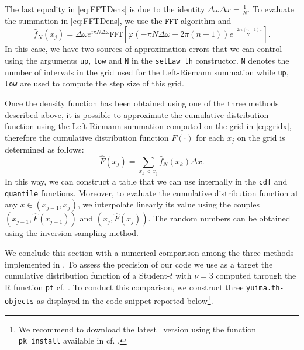 The last equality in \eqref{eq:FFTDens} is due to the identity \(\Delta \omega \Delta x = \frac{1}{N}\). To evaluate the summation in \eqref{eq:FFTDens}, we use the \(\texttt{FFT}\) algorithm and
\begin{equation}
\hat{f}_{N}\left(x_j\right) = \Delta \omega e^{i\pi N \Delta \omega}\texttt{FFT}\left[\varphi\left(-\pi N\Delta \omega + 2\pi \left(n-1\right)\right)e^{ \frac{-2 i \pi \left(n-1\right)a}{N}}\right].
\end{equation}
In this case, we have two sources of approximation errors that we can control using the arguments \texttt{up}, \texttt{low} and \texttt{N} in the \texttt{setLaw\_th} constructor. \texttt{N} denotes the number of intervals in the grid used for the Left-Riemann summation while \texttt{up}, \texttt{low} are used to compute the step size of this grid.

Once the density function has been obtained using one of the three methods described above, it is possible to approximate the cumulative distribution function using the Left-Riemann summation computed on the grid in \eqref{eq:gridx}, therefore the cumulative distribution function \(F\left(\cdot\right)\) for each \(x_j\) on the grid is determined as follows:
\begin{equation}
\hat{F}\left(x_j\right) = \sum_{x_k<x_j}\hat{f}_{N}\left(x_k\right)\Delta x.
\end{equation}
In this way, we can construct a table that we can use internally in the \texttt{cdf} and \texttt{quantile} functions. Moreover, to evaluate the cumulative distribution function at any \(x\in \left( x_{j-1}, x_j \right)\), we interpolate linearly its value using the couples \(\left(x_{j-1}, \hat{F}\left(x_{j-1}\right)\right)\) and \(\left(x_{j}, \hat{F}\left(x_{j}\right)\right)\). The random numbers can be obtained using the inversion sampling method.

We conclude this section with a numerical comparison among the three methods implemented in . To assess the precision of our code we use as a target the cumulative distribution function of a Student-\(t\) with \(\nu = 3\) computed through the \textsf{R} function \texttt{pt} cf. \citet{Man}. To conduct this comparison, we construct three \texttt{yuima.th-objects} as displayed in the code snippet reported below\footnote{We recommend to download the latest  ~version using the function \texttt{pk\_install} available in  cf. \citet{pak}.}.


